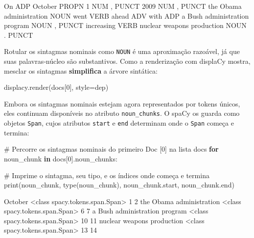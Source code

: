 \documentclass[
  brazilian,
  11pt,
]{article}
\newenvironment{Shaded}{\begin{snugshade}}{\end{snugshade}}
\newcommand{\BuiltInTok}[1]{\textcolor[rgb]{0.50,0.55,0.55}{#1}}
\newcommand{\CommentTok}[1]{\textcolor[rgb]{0.48,0.49,0.49}{#1}}
\newcommand{\ControlFlowTok}[1]{\textcolor[rgb]{0.99,0.74,0.29}{\textbf{#1}}}
\newcommand{\DecValTok}[1]{\textcolor[rgb]{0.96,0.45,0.00}{#1}}
\newcommand{\KeywordTok}[1]{\textcolor[rgb]{0.81,0.81,0.76}{\textbf{#1}}}
\newcommand{\NormalTok}[1]{\textcolor[rgb]{0.81,0.81,0.76}{#1}}
\newcommand{\OperatorTok}[1]{\textcolor[rgb]{0.81,0.81,0.76}{#1}}
\newcommand{\StringTok}[1]{\textcolor[rgb]{0.96,0.31,0.31}{#1}}
\let\oldtexttt\texttt
\renewcommand{\texttt}[1]{{\color{inlink}\oldtexttt{#1}}}
\begin{document}
\begin{Shaded}
\begin{Highlighting}[]
\NormalTok{On ADP}
\NormalTok{October PROPN}
\NormalTok{1 NUM}
\NormalTok{, PUNCT}
\NormalTok{2009 NUM}
\NormalTok{, PUNCT}
\NormalTok{the Obama administration NOUN}
\NormalTok{went VERB}
\NormalTok{ahead ADV}
\NormalTok{with ADP}
\NormalTok{a Bush administration program NOUN}
\NormalTok{, PUNCT}
\NormalTok{increasing VERB}
\NormalTok{nuclear weapons production NOUN}
\NormalTok{. PUNCT}
\end{Highlighting}
\end{Shaded}

Rotular os sintagmas nominais como \texttt{NOUN} é uma aproximação
razoável, já que suas palavras‑núcleo são substantivos. Como a
renderização com displaCy mostra, mesclar os sintagmas
\textbf{simplifica} a árvore sintática:

\begin{Shaded}
\begin{Highlighting}[]
\NormalTok{displacy.render(docs[}\DecValTok{0}\NormalTok{], style}\OperatorTok{=}\StringTok{\textquotesingle{}dep\textquotesingle{}}\NormalTok{)}
\end{Highlighting}
\end{Shaded}

Embora os sintagmas nominais estejam agora representados por tokens
únicos, eles continuam disponíveis no atributo \texttt{noun\_chunks}. O
spaCy os guarda como objetos \texttt{Span}, cujos atributos
\texttt{start} e \texttt{end} determinam onde o \texttt{Span} começa e
termina:

\begin{Shaded}
\begin{Highlighting}[]
\CommentTok{\# Percorre os sintagmas nominais do primeiro Doc [0] na lista \textquotesingle{}docs\textquotesingle{}}
\ControlFlowTok{for}\NormalTok{ noun\_chunk }\KeywordTok{in}\NormalTok{ docs[}\DecValTok{0}\NormalTok{].noun\_chunks:}

    \CommentTok{\# Imprime o sintagma, seu tipo, e os índices onde começa e termina}
    \BuiltInTok{print}\NormalTok{(noun\_chunk, }\BuiltInTok{type}\NormalTok{(noun\_chunk), noun\_chunk.start, noun\_chunk.end)}
\end{Highlighting}
\end{Shaded}

\begin{Shaded}
\begin{Highlighting}[]
\NormalTok{October \textless{}class \textquotesingle{}spacy.tokens.span.Span\textquotesingle{}\textgreater{} 1 2}
\NormalTok{the Obama administration \textless{}class \textquotesingle{}spacy.tokens.span.Span\textquotesingle{}\textgreater{} 6 7}
\NormalTok{a Bush administration program \textless{}class \textquotesingle{}spacy.tokens.span.Span\textquotesingle{}\textgreater{} 10 11}
\NormalTok{nuclear weapons production \textless{}class \textquotesingle{}spacy.tokens.span.Span\textquotesingle{}\textgreater{} 13 14}
\end{Highlighting}
\end{Shaded}
\end{document}
